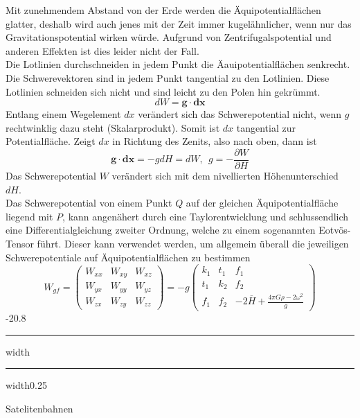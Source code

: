 \documentclass[8pt, landscape, fleqn]{scrartcl}
\makeatletter
\renewcommand{\section}{\@startsection{section}{1}{0mm}%
{-2\baselineskip}{0.8\baselineskip}%
{\hrule depth 0.2pt width\columnwidth\hrule depth1.5pt
width0.25\columnwidth\vspace*{1.2em}\Large\bfseries\rmfamily}}
\makeatother
\begin{document}
\begin{multicols*}{3}
Mit zunehmendem Abstand von der Erde werden die Äquipotentialflächen glatter, deshalb wird auch jenes mit der Zeit immer kugelähnlicher, wenn nur das Gravitationspotential wirken würde. Aufgrund von Zentrifugalspotential und anderen Effekten ist dies leider nicht der Fall. \\

Die Lotlinien durchschneiden in jedem Punkt die Äauipotentialflächen senkrecht. Die Schwerevektoren sind in jedem Punkt tangential zu den Lotlinien. Diese Lotlinien schneiden sich nicht und sind leicht zu den Polen hin gekrümmt.
\begin{equation*}
    dW = \mathbf{g} \cdot \mathbf{dx}
\end{equation*}
Entlang einem Wegelement $dx$ verändert sich das Schwerepotential nicht, wenn $g$ rechtwinklig dazu steht (Skalarprodukt). Somit ist $dx$ tangential zur Potentialfläche. Zeigt $dx$ in Richtung des Zenits, also nach oben, dann ist
\begin{equation*}
    \mathbf{g} \cdot \mathbf{dx} = -g dH = dW,~~ g = -\frac{\partial W}{\partial H}
\end{equation*}
Das Schwerepotential $W$ verändert sich mit dem nivellierten Höhenunterschied $dH$. \\

Das Schwerepotential von einem Punkt $Q$ auf der gleichen Äquipotentialfläche liegend mit $P$, kann angenähert durch eine Taylorentwicklung und schlussendlich eine Differentialgleichung zweiter Ordnung, welche zu einem sogenannten Eotvös-Tensor führt. Dieser kann verwendet werden, um allgemein überall die jeweiligen Schwerepotentiale auf Äquipotentialflächen zu bestimmen
\begin{equation*}
    W_{gf} = \begin{pmatrix}
        W_{xx} & W_{xy} & W_{xz} \\
        W_{yx} & W_{yy} & W_{yz} \\
        W_{zx} & W_{zy} & W_{zz}
    \end{pmatrix} = - g \begin{pmatrix}
        k_1 & t_1 & f_1 \\
        t_1 & k_2 & f_2 \\
        f_1 & f_2 & -2 \overline{H} + \frac{4 \pi G \rho - 2 \omega^2}{g}
    \end{pmatrix}
\end{equation*}
\section{Satelitenbahnen}

\end{multicols*}
\end{document}
